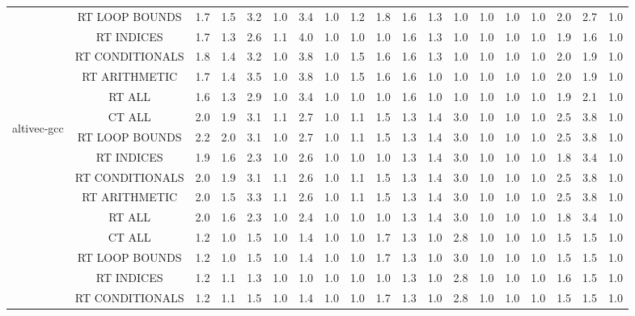 \begin{adjustbox}{center}
\begin{tabular}{|c|c|c|c|c|c|c|c|c|c|c|c|c|c|c|c|c|c|c|}
 & RT LOOP BOUNDS & 1.7 & 1.5 & 3.2 & 1.0 & 3.4 & 1.0 & 1.2 & 1.8 & 1.6 & 1.3 & 1.0 & 1.0 & 1.0 & 1.0 & 2.0 & 2.7 & 1.0 \\ 
 & RT INDICES & 1.7 & 1.3 & 2.6 & 1.1 & 4.0 & 1.0 & 1.0 & 1.0 & 1.6 & 1.3 & 1.0 & 1.0 & 1.0 & 1.0 & 1.9 & 1.6 & 1.0 \\ 
 & RT CONDITIONALS & 1.8 & 1.4 & 3.2 & 1.0 & 3.8 & 1.0 & 1.5 & 1.6 & 1.6 & 1.3 & 1.0 & 1.0 & 1.0 & 1.0 & 2.0 & 1.9 & 1.0 \\ 
 & RT ARITHMETIC & 1.7 & 1.4 & 3.5 & 1.0 & 3.8 & 1.0 & 1.5 & 1.6 & 1.6 & 1.0 & 1.0 & 1.0 & 1.0 & 1.0 & 2.0 & 1.9 & 1.0 \\ 
 & RT ALL & 1.6 & 1.3 & 2.9 & 1.0 & 3.4 & 1.0 & 1.0 & 1.0 & 1.6 & 1.0 & 1.0 & 1.0 & 1.0 & 1.0 & 1.9 & 2.1 & 1.0 \\ 
\hline 
  \multirow{7}{*}{\begin{turn}{90}altivec-gcc\end{turn}} & CT ALL &2.0 & 1.9 & 3.1 & 1.1 & 2.7 & 1.0 & 1.1 & 1.5 & 1.3 & 1.4 & 3.0 & 1.0 & 1.0 & 1.0 & 2.5 & 3.8 & 1.0 \\ 
 & RT LOOP BOUNDS & 2.2 & 2.0 & 3.1 & 1.0 & 2.7 & 1.0 & 1.1 & 1.5 & 1.3 & 1.4 & 3.0 & 1.0 & 1.0 & 1.0 & 2.5 & 3.8 & 1.0 \\ 
 & RT INDICES & 1.9 & 1.6 & 2.3 & 1.0 & 2.6 & 1.0 & 1.0 & 1.0 & 1.3 & 1.4 & 3.0 & 1.0 & 1.0 & 1.0 & 1.8 & 3.4 & 1.0 \\ 
 & RT CONDITIONALS & 2.0 & 1.9 & 3.1 & 1.1 & 2.6 & 1.0 & 1.1 & 1.5 & 1.3 & 1.4 & 3.0 & 1.0 & 1.0 & 1.0 & 2.5 & 3.8 & 1.0 \\ 
 & RT ARITHMETIC & 2.0 & 1.5 & 3.3 & 1.1 & 2.6 & 1.0 & 1.1 & 1.5 & 1.3 & 1.4 & 3.0 & 1.0 & 1.0 & 1.0 & 2.5 & 3.8 & 1.0 \\ 
 & RT ALL & 2.0 & 1.6 & 2.3 & 1.0 & 2.4 & 1.0 & 1.0 & 1.0 & 1.3 & 1.4 & 3.0 & 1.0 & 1.0 & 1.0 & 1.8 & 3.4 & 1.0 \\ 
\hline 
  \multirow{7}{*}{\begin{turn}{90}altivec-ibm\end{turn}} & CT ALL &1.2 & 1.0 & 1.5 & 1.0 & 1.4 & 1.0 & 1.0 & 1.7 & 1.3 & 1.0 & 2.8 & 1.0 & 1.0 & 1.0 & 1.5 & 1.5 & 1.0 \\ 
 & RT LOOP BOUNDS & 1.2 & 1.0 & 1.5 & 1.0 & 1.4 & 1.0 & 1.0 & 1.7 & 1.3 & 1.0 & 3.0 & 1.0 & 1.0 & 1.0 & 1.5 & 1.5 & 1.0 \\ 
 & RT INDICES & 1.2 & 1.1 & 1.3 & 1.0 & 1.0 & 1.0 & 1.0 & 1.0 & 1.3 & 1.0 & 2.8 & 1.0 & 1.0 & 1.0 & 1.6 & 1.5 & 1.0 \\ 
 & RT CONDITIONALS & 1.2 & 1.1 & 1.5 & 1.0 & 1.4 & 1.0 & 1.0 & 1.7 & 1.3 & 1.0 & 2.8 & 1.0 & 1.0 & 1.0 & 1.5 & 1.5 & 1.0 \\ 

\end{tabular}
\end{adjustbox}
